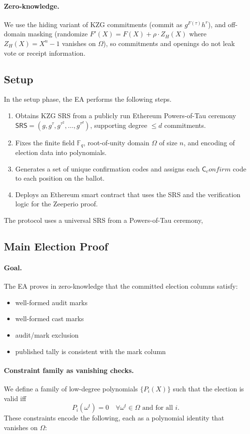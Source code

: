 \paragraph{Zero-knowledge.}
We use the hiding variant of KZG commitments (commit as $g^{F(\tau)}h^r$), and
off-domain masking (randomize $F'(X)=F(X)+\rho\cdot Z_H(X)$ where $Z_H(X)=X^n-1$ vanishes on $\Omega$),
so commitments and openings do not leak vote or receipt information.  

\subsection{Setup}
In the setup phase, the EA performs the following steps.
\begin{enumerate}[label=(S\arabic*)]
  \item Obtains KZG SRS from a publicly run Ethereum Powers-of-Tau ceremony $\mathsf{SRS}=(g,g^\tau,g^{\tau^2},\dots,g^{\tau^d})$, supporting degree $\le d$ commitments. 
  \item Fixes the finite field $\mathbb{F}_q$, root-of-unity domain $\Omega$ of size $n$, and encoding of election data into polynomials.
  \item Generates a set of unique confirmation codes and assigns each $\mathsf{C}_confirm$ code to each position on the ballot.
  \item Deploys an Ethereum smart contract that uses the SRS and the verification logic for the Zeeperio proof.
\end{enumerate}
The protocol uses a universal SRS from a Powers-of-Tau ceremony,
 

\subsection{Main Election Proof}
\paragraph{Goal.}
The EA proves in zero-knowledge that the committed election columns satisfy:
\begin{itemize}
\item well-formed audit marks
\item well-formed cast marks
\item audit/mark exclusion
\item published tally is consistent with the mark column
\end{itemize}


\paragraph{Constraint family as vanishing checks.}
We define a family of low-degree polynomials $\{P_i(X)\}$ such that the election is valid iff
\begin{equation*}
P_i(\omega^t)=0 \quad \forall \omega^t\in\Omega \text{ and for all } i.
\end{equation*}
These constraints encode the following, each as a polynomial identity that vanishes on $\Omega$:

